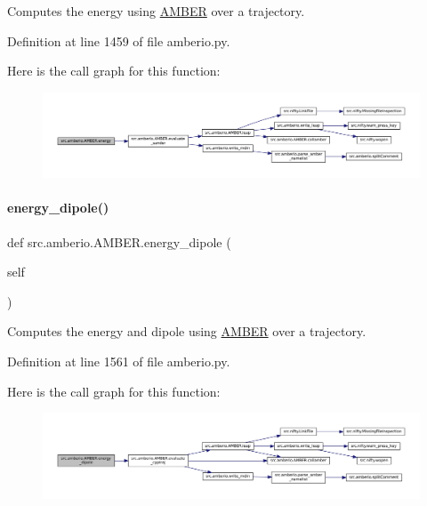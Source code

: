 Computes the energy using \hyperlink{classsrc_1_1amberio_1_1AMBER}{A\+M\+B\+ER} over a trajectory. 



Definition at line 1459 of file amberio.\+py.

Here is the call graph for this function\+:
\nopagebreak
\begin{figure}[H]
\begin{center}
\leavevmode
\includegraphics[width=350pt]{classsrc_1_1amberio_1_1AMBER_a7d4ea449a1f78e9795b323547734a217_cgraph}
\end{center}
\end{figure}
\mbox{\label{classsrc_1_1amberio_1_1AMBER_ad1b30b32523e26cb14482970359d0e61}} 
\paragraph{\texorpdfstring{energy\+\_\+dipole()}{energy\_dipole()}}
{\footnotesize\ttfamily def src.\+amberio.\+A\+M\+B\+E\+R.\+energy\+\_\+dipole (\begin{DoxyParamCaption}\item[{}]{self }\end{DoxyParamCaption})}



Computes the energy and dipole using \hyperlink{classsrc_1_1amberio_1_1AMBER}{A\+M\+B\+ER} over a trajectory. 



Definition at line 1561 of file amberio.\+py.

Here is the call graph for this function\+:
\nopagebreak
\begin{figure}[H]
\begin{center}
\leavevmode
\includegraphics[width=350pt]{classsrc_1_1amberio_1_1AMBER_ad1b30b32523e26cb14482970359d0e61_cgraph}
\end{center}
\end{figure}
\mbox{\label{classsrc_1_1amberio_1_1AMBER_ab2237300f0b314b61e034c1d43504d2c}} 

